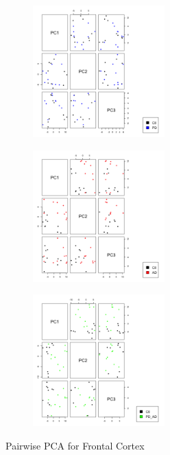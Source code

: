 \begin{figure}
\begin{subfigure}[b]{0.33\linewidth}
\centering
\includegraphics[width=2.0in]{./Figures/fig3/Fig3a-Frontal-Cortex_CtlvsPD.png}
\end{subfigure}%
\begin{subfigure}[b]{0.33\linewidth}
\centering
\includegraphics[width=2.0in]{./Figures/fig3/Fig3b-Frontal-Cortex_CtlvsAD.png}
\end{subfigure}%
\begin{subfigure}[b]{0.33\linewidth}
\centering
\includegraphics[width=2.0in]{./Figures/fig3/Fig3c-Frontal-Cortex_CtlvsADPD.png}
\end{subfigure}
\caption{\label{fig3FC} Pairwise PCA for Frontal Cortex}


\end{figure}
